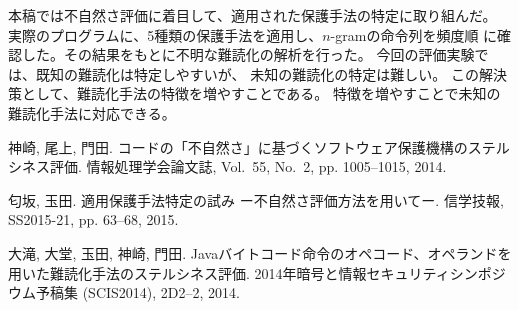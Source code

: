 \documentclass[a4j,fleqn,10pt]{jarticle}
\begin{document}

本稿では不自然さ評価に着目して、適用された保護手法の特定に取り組んだ。
実際のプログラムに、5種類の保護手法を適用し、$n$-gramの命令列を頻度順
に確認した。その結果をもとに不明な難読化の解析を行った。
今回の評価実験では、既知の難読化は特定しやすいが、
未知の難読化の特定は難しい。
この解決策として、難読化手法の特徴を増やすことである。
特徴を増やすことで未知の難読化手法に対応できる。

\begin{thebibliography}{1}

神崎, 尾上, 門田.
\newblock コードの「不自然さ」に基づくソフトウェア保護機構のステルシネス評価.
\newblock 情報処理学会論文誌, Vol.~55, No.~2, pp. 1005--1015, 2014.

匂坂, 玉田.
\newblock 適用保護手法特定の試み ー不自然さ評価方法を用いてー.
\newblock  信学技報, SS2015-21, pp. 63--68, 2015.

大滝, 大堂, 玉田, 神崎, 門田.
\newblock
  Javaバイトコード命令のオペコード、オペランドを用いた難読化手法のステルシネス評価.
\newblock  2014年暗号と情報セキュリティシンポジウム予稿集 (SCIS2014), 
  2D2--2, 2014.

\end{thebibliography}
\end{document}
